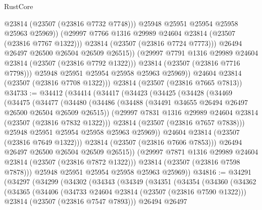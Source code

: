 \begin{lexlean}{RustCore}
\begin{coremodule}
                        @23814
                        (@23507 (@23816 @7732 @7748)))
                      @25948
                      @25951
                      @25954
                      @25958
                      @25963
                      @25969))
                  (@29997 @7766 @1316 @29989 @24604 @23814 (@23507 (@23816 @7767 @1322)))
                  @23814
                  (@23507 (@23816 @7724 @7773)))
                @26494
                @26497
                @26500
                @26504
                @26509
                @26515))
            (@29997 @7791 @1316 @29989 @24604 @23814 (@23507 (@23816 @7792 @1322)))
            @23814
            (@23507 (@23816 @7716 @7798)))
          @25948
          @25951
          @25954
          @25958
          @25963
          @25969))
      @24604
      @23814
      (@23507 (@23816 @7708 @1322)))
    @23814
    (@23507 (@23816 @7665 @7813))
@34733 := @34412
    (@34414
      (@34417
        (@34423
          (@34425
            (@34428
              (@34469
                (@34475
                  (@34477
                    (@34480
                      (@34486
                        (@34488 (@34491 @34655 @26494 @26497 @26500 @26504 @26509 @26515))
                        (@29997 @7831 @1316 @29989 @24604 @23814 (@23507 (@23816 @7832 @1322)))
                        @23814
                        (@23507 (@23816 @7657 @7838)))
                      @25948
                      @25951
                      @25954
                      @25958
                      @25963
                      @25969))
                  @24604
                  @23814
                  (@23507 (@23816 @7649 @1322)))
                @23814
                (@23507 (@23816 @7606 @7853)))
              @26494
              @26497
              @26500
              @26504
              @26509
              @26515))
          (@29997 @7871 @1316 @29989 @24604 @23814 (@23507 (@23816 @7872 @1322)))
          @23814
          (@23507 (@23816 @7598 @7878)))
        @25948
        @25951
        @25954
        @25958
        @25963
        @25969))
@34816 := @34291
    (@34297
      (@34299
        (@34302
          (@34343
            (@34349
              (@34351
                (@34354
                  (@34360
                    (@34362
                      (@34365
                        (@34406
                          (@34733 @24604 @23814 (@23507 (@23816 @7590 @1322)))
                          @23814
                          (@23507 (@23816 @7547 @7893)))
                        @26494
                        @26497

\end{coremodule}
\end{lexlean}
